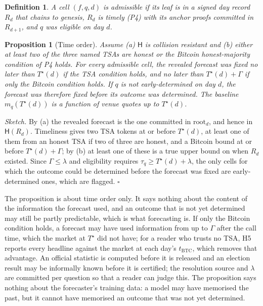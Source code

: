 \documentclass[11pt]{article}
\newtheorem{proposition}{Proposition}
\newtheorem{definition}{Definition}
\newcommand{\Hh}{\mathsf{H}}
\newcommand{\Ts}{T^{\star}}
\begin{document}
\begin{definition}
A cell $(f,q,d)$ is \emph{admissible} if its leaf is in a signed day record $R_d$ that chains to genesis, $R_d$ is timely (P4) with its anchor proofs committed in $R_{d+1}$, and $q$ was eligible on day $d$.
\end{definition}

\begin{proposition}[Time order]
Assume (a) $\Hh$ is collision resistant and (b) either at least two of the three named TSAs are honest or the Bitcoin honest-majority condition of P4 holds. For every admissible cell, the revealed forecast was fixed no later than $\Ts(d)$ if the TSA condition holds, and no later than $\Ts(d) + \Gamma$ if only the Bitcoin condition holds. If $q$ is not early-determined on day $d$, the forecast was therefore fixed before its outcome was determined. The baseline $m_q(\Ts(d))$ is a function of venue quotes up to $\Ts(d)$.
\end{proposition}

\noindent\emph{Sketch.} By (a) the revealed forecast is the one committed in $\mathrm{root}_d$, and hence in $\Hh(R_d)$. Timeliness gives two TSA tokens at or before $\Ts(d)$, at least one of them from an honest TSA if two of three are honest, and a Bitcoin bound at or before $\Ts(d) + \Gamma$; by (b) at least one of these is a true upper bound on when $R_d$ existed. Since $\Gamma \le \lambda$ and eligibility requires $\tau_q \ge \Ts(d) + \lambda$, the only cells for which the outcome could be determined before the forecast was fixed are early-determined ones, which are flagged. $\square$

The proposition is about time order only. It says nothing about the content of the information the forecast used, and an outcome that is not yet determined may still be partly predictable, which is what forecasting is. If only the Bitcoin condition holds, a forecast may have used information from up to $\Gamma$ after the call time, which the market at $\Ts$ did not have; for a reader who trusts no TSA, H5 reports every headline against the market at each day's $t_{\mathrm{BTC}}$, which removes that advantage. An official statistic is computed before it is released and an election result may be informally known before it is certified; the resolution source and $\lambda$ are committed per question so that a reader can judge this. The proposition says nothing about the forecaster's training data: a model may have memorised the past, but it cannot have memorised an outcome that was not yet determined.
\end{document}
